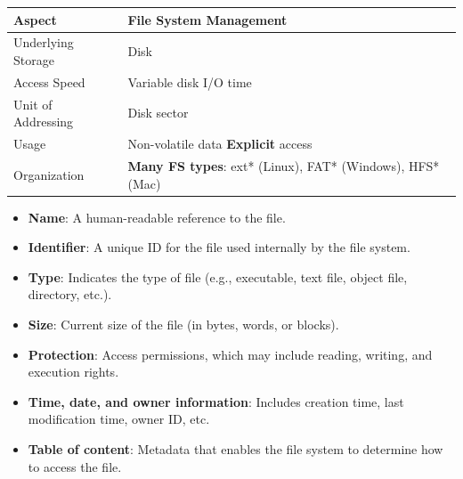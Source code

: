 \documentclass[8pt,twocolumn]{article}
\begin{document}
    \begin{table}[h!]
        \centering
        \renewcommand{\arraystretch}{0.6}
        \begin{tabular}{|l|p{6cm}|}
        \hline
        \textbf{Aspect} & \textbf{File System Management} \\
        \hline
        Underlying Storage & Disk \\
        \hline
        Access Speed & Variable disk I/O time \\
        \hline
        Unit of Addressing & Disk sector \\
        \hline
        Usage & Non-volatile data \newline \textbf{Explicit} access \\
        \hline
        Organization & \textbf{Many FS types}: ext* (Linux), FAT* (Windows), HFS* (Mac) \\
        \hline
        \end{tabular}
        \end{table}
        \vspace{-1.5em} %
\begin{itemize}
    \setlength{\itemsep}{0pt} %
    \setlength{\parskip}{0pt}
  \item \textbf{Name}: A human-readable reference to the file.
  \item \textbf{Identifier}: A unique ID for the file used internally by the file system.
  \item \textbf{Type}: Indicates the type of file (e.g., executable, text file, object file, directory, etc.).
  \item \textbf{Size}: Current size of the file (in bytes, words, or blocks).
  \item \textbf{Protection}: Access permissions, which may include reading, writing, and execution rights.
  \item \textbf{Time, date, and owner information}: Includes creation time, last modification time, owner ID, etc.
  \item \textbf{Table of content}: Metadata that enables the file system to determine how to access the file.
\end{itemize}
\vspace*{-1.2em}
\end{document}
